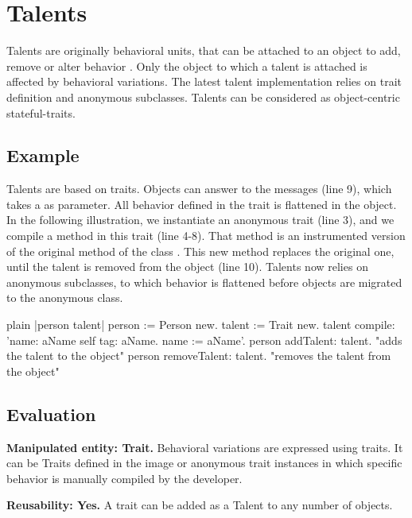 \documentclass[10pt,twoside,english]{_support/latex/sbabook/sbabook}
\begin{document}
\frontmatter
\pagestyle{plain}

\tableofcontents*
\clearpage\listoffigures

\mainmatter

\chapter{Talents}
Talents are originally behavioral units, that can be attached to an object to add, remove or alter behavior \cite{ressia2014talents}. Only the object to which a talent is attached is affected by behavioral variations. The latest talent implementation relies on trait definition and anonymous subclasses. Talents can be considered as object-centric stateful-traits.
\section{Example}
Talents are based on traits. Objects can answer to the  messages (line 9), which takes a  as parameter. All behavior defined in the trait is flattened in the object. In the following illustration, we instantiate an anonymous trait (line 3), and we compile a method in this trait (line 4-8). That method is an instrumented version of the original  method of the class . This new method replaces the original one, until the talent is removed from the object (line 10). Talents now relies on anonymous subclasses, to which behavior is flattened before objects are migrated to the anonymous class.

\begin{displaycode}{plain}
|person talent|
  person := Person new.
	talent := Trait new.
	talent
		compile:
			'name: aName
	       self tag: aName.
	       name := aName'.
	person addTalent: talent. "adds the talent to the object"
  person removeTalent: talent. "removes the talent from the object"
\end{displaycode}
\section{Evaluation}
\textbf{Manipulated entity: Trait.} Behavioral variations are expressed using traits. It can be Traits defined in the image or anonymous trait instances in which specific behavior is manually compiled by the developer.

\textbf{Reusability: Yes.} A trait can be added as a Talent to any number of objects.
\end{document}
